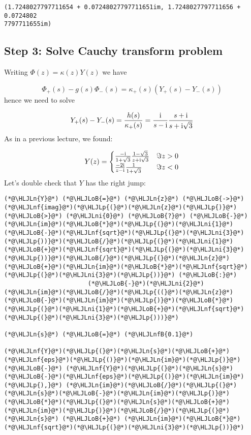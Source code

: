 \documentclass[12pt,a4paper]{article}
\newcommand{\HLJLn}[1]{#1}
\newcommand{\HLJLnf}[1]{\textcolor[RGB]{66,102,213}{#1}}
\newcommand{\HLJLnfB}[1]{\textcolor[RGB]{59,151,46}{#1}}
\newcommand{\HLJLni}[1]{\textcolor[RGB]{59,151,46}{#1}}
\newcommand{\HLJLoB}[1]{\textcolor[RGB]{102,102,102}{\textbf{#1}}}
\newcommand{\HLJLp}[1]{#1}
\def\I{ {\rm i} }
\begin{document}
\begin{lstlisting}
(1.7248027797711654 + 0.07248027797711651im, 1.7248027797711656 + 0.0724802
7797711655im)
\end{lstlisting}


\subsection{Step 3: Solve Cauchy transform problem}
Writing $\Phi(z) = \kappa(z) Y(z)$ we have

\[
\Phi_+(s) - g(s) \Phi_-(s) = \kappa_+(s) (Y_+(s) - Y_-(s))
\]
hence we need to solve

\[
Y_+(s) - Y_-(s) = {h(s) \over \kappa_+(s)} = {\I \over s- \I} {s + \I \over s+ \I \sqrt{3}}
\]
As in a previous lecture, we found:

\[
Y(z) = \begin{cases}
{-\I \over 1+\sqrt 3} {1-\sqrt 3 \over z+ \I \sqrt{3}} & \Im z > 0 \\
{-2 \I \over z-\I}{1 \over 1+ \sqrt{3}} & \Im z < 0
\end{cases}
\]
Let's double check that $Y$ has the right jump:


\begin{lstlisting}
(*@\HLJLn{Y}@*) (*@\HLJLoB{=}@*) (*@\HLJLn{z}@*) (*@\HLJLoB{->}@*) (*@\HLJLnf{imag}@*)(*@\HLJLp{(}@*)(*@\HLJLn{z}@*)(*@\HLJLp{)}@*) (*@\HLJLoB{>}@*) (*@\HLJLni{0}@*) (*@\HLJLoB{?}@*) (*@\HLJLoB{-}@*)(*@\HLJLn{im}@*)(*@\HLJLoB{*}@*)(*@\HLJLp{(}@*)(*@\HLJLni{1}@*)(*@\HLJLoB{-}@*)(*@\HLJLnf{sqrt}@*)(*@\HLJLp{(}@*)(*@\HLJLni{3}@*)(*@\HLJLp{))}@*)(*@\HLJLoB{/}@*)(*@\HLJLp{(}@*)(*@\HLJLni{1}@*)(*@\HLJLoB{+}@*)(*@\HLJLnf{sqrt}@*)(*@\HLJLp{(}@*)(*@\HLJLni{3}@*)(*@\HLJLp{))}@*)(*@\HLJLoB{/}@*)(*@\HLJLp{(}@*)(*@\HLJLn{z}@*)(*@\HLJLoB{+}@*)(*@\HLJLn{im}@*)(*@\HLJLoB{*}@*)(*@\HLJLnf{sqrt}@*)(*@\HLJLp{(}@*)(*@\HLJLni{3}@*)(*@\HLJLp{))}@*) (*@\HLJLoB{:}@*)
                       (*@\HLJLoB{-}@*)(*@\HLJLni{2}@*)(*@\HLJLn{im}@*)(*@\HLJLoB{/}@*)(*@\HLJLp{((}@*)(*@\HLJLn{z}@*)(*@\HLJLoB{-}@*)(*@\HLJLn{im}@*)(*@\HLJLp{)}@*)(*@\HLJLoB{*}@*)(*@\HLJLp{(}@*)(*@\HLJLni{1}@*)(*@\HLJLoB{+}@*)(*@\HLJLnf{sqrt}@*)(*@\HLJLp{(}@*)(*@\HLJLni{3}@*)(*@\HLJLp{)))}@*)

(*@\HLJLn{s}@*) (*@\HLJLoB{=}@*) (*@\HLJLnfB{0.1}@*)

(*@\HLJLnf{Y}@*)(*@\HLJLp{(}@*)(*@\HLJLn{s}@*)(*@\HLJLoB{+}@*)(*@\HLJLnf{eps}@*)(*@\HLJLp{()}@*)(*@\HLJLn{im}@*)(*@\HLJLp{)}@*) (*@\HLJLoB{-}@*) (*@\HLJLnf{Y}@*)(*@\HLJLp{(}@*)(*@\HLJLn{s}@*)(*@\HLJLoB{-}@*)(*@\HLJLnf{eps}@*)(*@\HLJLp{()}@*)(*@\HLJLn{im}@*)(*@\HLJLp{),}@*) (*@\HLJLn{im}@*)(*@\HLJLoB{/}@*)(*@\HLJLp{(}@*)(*@\HLJLn{s}@*)(*@\HLJLoB{-}@*)(*@\HLJLn{im}@*)(*@\HLJLp{)}@*)(*@\HLJLoB{*}@*)(*@\HLJLp{(}@*)(*@\HLJLn{s}@*)(*@\HLJLoB{+}@*)(*@\HLJLn{im}@*)(*@\HLJLp{)}@*)(*@\HLJLoB{/}@*)(*@\HLJLp{(}@*)(*@\HLJLn{s}@*) (*@\HLJLoB{+}@*) (*@\HLJLn{im}@*)(*@\HLJLoB{*}@*)(*@\HLJLnf{sqrt}@*)(*@\HLJLp{(}@*)(*@\HLJLni{3}@*)(*@\HLJLp{))}@*)
\end{lstlisting}
\end{document}
